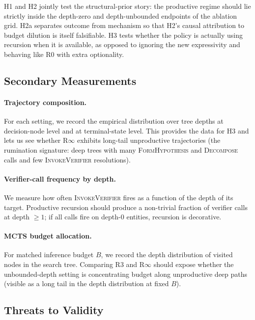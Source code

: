 H1 and H2 jointly test the structural-prior story: the productive
regime should lie strictly inside the depth-zero and depth-unbounded
endpoints of the ablation grid. H2a separates outcome from mechanism
so that H2's causal attribution to budget dilution is itself
falsifiable. H3 tests whether the policy is actually using recursion
when it is available, as opposed to ignoring the new expressivity and
behaving like R0 with extra optionality.

\subsection{Secondary Measurements}
\label{sec:exp-secondary}

\paragraph{Trajectory composition.}
For each setting, we record the empirical distribution over tree depths
at decision-node level and at terminal-state level. This provides the
data for H3 and lets us see whether R$\infty$ exhibits long-tail
unproductive trajectories (the rumination signature: deep trees with
many \textsc{FormHypothesis} and \textsc{Decompose} calls and few
\textsc{InvokeVerifier} resolutions).

\paragraph{Verifier-call frequency by depth.}
We measure how often \textsc{InvokeVerifier} fires as a function of the
depth of its target. Productive recursion should produce a non-trivial
fraction of verifier calls at depth $\geq 1$; if all calls fire on
depth-$0$ entities, recursion is decorative.

\paragraph{MCTS budget allocation.}
For matched inference budget $B$, we record the depth distribution of
visited nodes in the search tree. Comparing R3 and R$\infty$ should
expose whether the unbounded-depth setting is concentrating budget along
unproductive deep paths (visible as a long tail in the depth
distribution at fixed $B$).

\subsection{Threats to Validity}
\label{sec:exp-threats}

